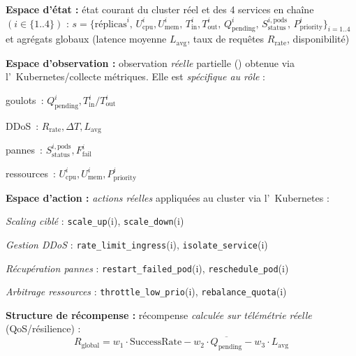 \begin{enumerate*}[label={\roman*)}, itemjoin={;\quad}]
    \item \textbf{Espace d'état :} état courant du cluster réel et des 4 services en chaîne \((i \in \{1..4\})\) :
    \(
    s = \{\text{réplicas}^i,\,
    U_{\text{cpu}}^i, U_{\text{mem}}^i,\,
    T_{\text{in}}^i, T_{\text{out}}^i,\,
    Q_{\text{pending}}^i,\,
    S_{\text{status}}^{i,\text{pods}},\,
    P_{\text{priority}}^i\}_{i=1..4}
    \)
    et agrégats globaux (latence moyenne \(L_{\text{avg}}\), taux de requêtes \(R_{\text{rate}}\), disponibilité)
    \item \textbf{Espace d'observation :} observation \emph{réelle} partielle () obtenue via l’~Kubernetes/collecte métriques. Elle est \emph{spécifique au rôle} :
    \begin{enumerate*}[label={}, itemjoin={;\,}]
        \item goulots~: \(Q_{\text{pending}}^i, T_{\text{in}}^i/T_{\text{out}}^i\)
        \item DDoS~: \(R_{\text{rate}}, \Delta T, L_{\text{avg}}\)
        \item pannes~: \(S_{\text{status}}^{i,\text{pods}}, F_{\text{fail}}^i\)
        \item ressources~: \(U_{\text{cpu}}^i, U_{\text{mem}}^i, P_{\text{priority}}^i\)
    \end{enumerate*}
    \item \textbf{Espace d'action :} \emph{actions réelles} appliquées au cluster via l’~Kubernetes :
    \begin{enumerate*}[label={\roman*)}, itemjoin={;\quad}]
        \item \emph{Scaling ciblé} : \texttt{scale\_up}(i), \texttt{scale\_down}(i)
        \item \emph{Gestion DDoS} : \texttt{rate\_limit\_ingress}(i), \texttt{isolate\_service}(i)
        \item \emph{Récupération pannes} : \texttt{restart\_failed\_pod}(i), \texttt{reschedule\_pod}(i)
        \item \emph{Arbitrage ressources} : \texttt{throttle\_low\_prio}(i), \texttt{rebalance\_quota}(i)
    \end{enumerate*}
    \item \textbf{Structure de récompense :} récompense \emph{calculée sur télémétrie réelle} (QoS/résilience) :
    \[
        R_{\text{global}}=
        w_1\cdot\text{SuccessRate}
        -w_2\cdot\overline{Q_{\text{pending}}}
        -w_3\cdot L_{\text{avg}}
\]
\end{enumerate*}

